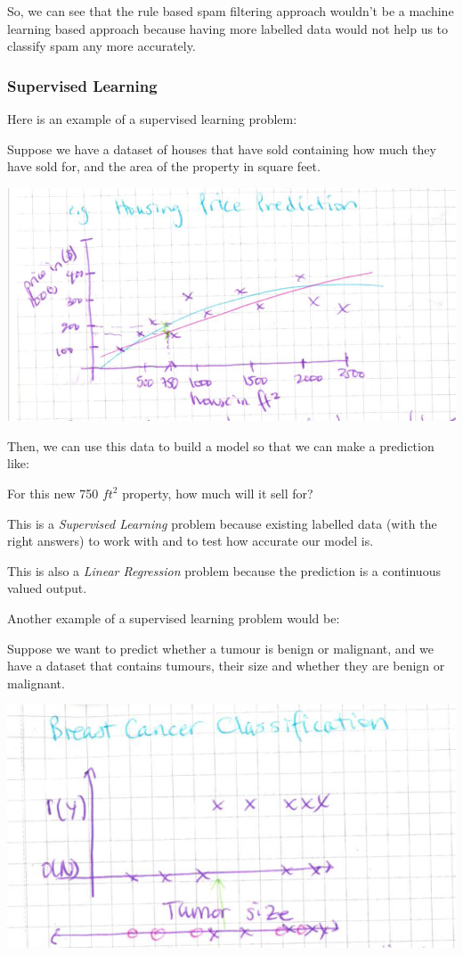 \documentclass[12pt]{article}
\begin{document}
So, we can see that the rule based spam filtering approach wouldn't be a machine learning based approach because having more labelled data would not help us to classify spam any more accurately.

\subsubsection{Supervised Learning}

Here is an example of a supervised learning problem: 

Suppose we have a dataset of houses that have sold containing how much they have sold for, and the area of the property in square feet. 

\includegraphics[width={\textwidth}]{housing-prices}

Then, we can use this data to build a model so that we can make a prediction like:

For this new 750 $ft^2$ property, how much will it sell for?

This is a \textit{Supervised Learning} problem because existing labelled data (with the right answers) to work with and to test how accurate our model is.

This is also a \textit{Linear Regression} problem because the prediction is a continuous valued output. 

Another example of a supervised learning problem would be:

Suppose we want to predict whether a tumour is benign or malignant, and we have a dataset that contains tumours, their size and whether they are benign or malignant.

\includegraphics[width={\textwidth}]{tumour-size}
\end{document}
